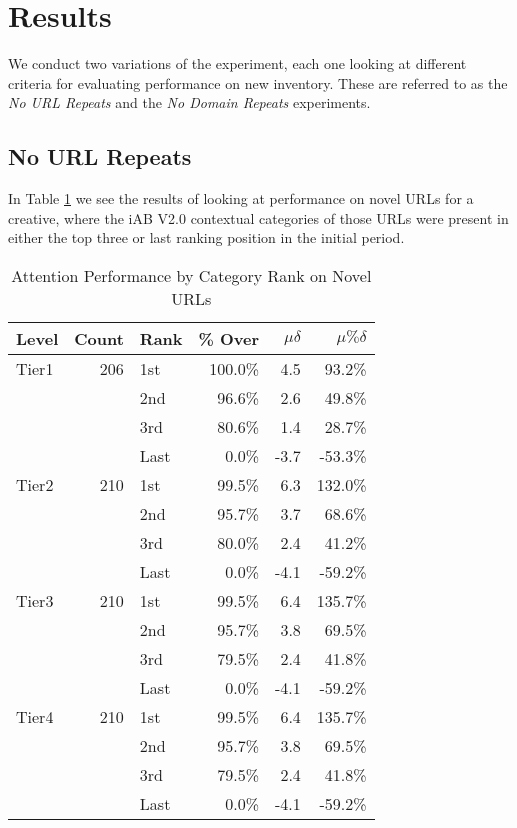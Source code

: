\documentclass[sigconf]{acmart}
\begin{document}
\section{Results}

We conduct two variations of the experiment, each one looking at different
criteria for evaluating performance on new inventory.
These are referred to as the
\emph{No URL Repeats} and the \emph{No Domain Repeats} experiments.

\subsection{No URL Repeats}

In Table \ref{tab:nourlrepeats} we see the results of looking at performance on novel
URLs for a creative, where the iAB V2.0 contextual categories of those URLs were present
in either the top three or last ranking position in the initial period.

\begin{table}
\caption{Attention Performance by Category Rank on Novel URLs}
\label{tab:nourlrepeats}
\begin{tabular}{|l|r|l|r|r|r|}
\toprule
Level   &Count    &Rank &\% Over  &$\mu\delta$  &$\mu\%\delta$        \\
\midrule
Tier1   &206      &1st  &100.0\%    &4.5         &93.2\%     \\
        &         &2nd  &96.6\%     &2.6         &49.8\%     \\
        &         &3rd  &80.6\%     &1.4         &28.7\%     \\
        &         &Last &0.0\%      &-3.7        &-53.3\%     \\
Tier2   &210      &1st  &99.5\%     &6.3         &132.0\%     \\
        &         &2nd  &95.7\%     &3.7         &68.6\%     \\
        &         &3rd  &80.0\%     &2.4         &41.2\%     \\
        &         &Last &0.0\%      &-4.1        &-59.2\%     \\
Tier3   &210      &1st  &99.5\%     &6.4         &135.7\%     \\
        &         &2nd  &95.7\%     &3.8         &69.5\%     \\
        &         &3rd  &79.5\%     &2.4         &41.8\%     \\
        &         &Last &0.0\%      &-4.1        &-59.2\%     \\
Tier4   &210      &1st  &99.5\%     &6.4         &135.7\%     \\
        &         &2nd  &95.7\%     &3.8         &69.5\%     \\
        &         &3rd  &79.5\%     &2.4         &41.8\%     \\
        &         &Last &0.0\%      &-4.1        &-59.2\%     \\
\bottomrule
\end{tabular}
\end{table}
\end{document}
